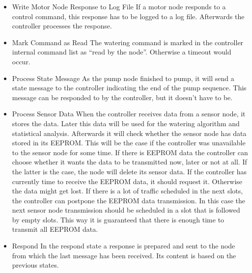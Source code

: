 \begin{itemize}
	\item Write Motor Node Response to Log File
		If a motor node responds to a control command, this response has to be logged to a log file. Afterwards the controller processes the response.
	\item Mark Command as Read
		The watering command is marked in the controller internal command list as ``read by the node''. Otherwise a timeout would occur.
		
	\item Process State Message
		As the pump node finished to pump, it will send a state message to the controller indicating the end of the pump sequence. This message can be responded to by the controller, but it doesn't have to be.
		
	\item Process Sensor Data
		When the controller receives data from a sensor node, it stores the data. Later this data will be used for the watering algorithm and statistical analysis. Afterwards it will check whether the sensor node has data stored in its EEPROM. This will be the case if the controller was unavailable to the sensor node for some time. If there is EEPROM data the controller can choose whether it wants the data to be transmitted now, later or not at all. If the latter is the case, the node will delete its sensor data. If the controller has currently time to receive the EEPROM data, it should request it. Otherwise the data might get lost. If there is a lot of traffic scheduled in the next slots, the controller can postpone the EEPROM data transmission. In this case the next sensor node transmission should be scheduled in a slot that is followed by empty slots. This way it is guaranteed that there is enough time to transmit all EEPROM data.
	
	\item Respond
		In the respond state a response is prepared and sent to the node from which the last message has been received. Its content is based on the previous states.
		
	
	
\end{itemize}


